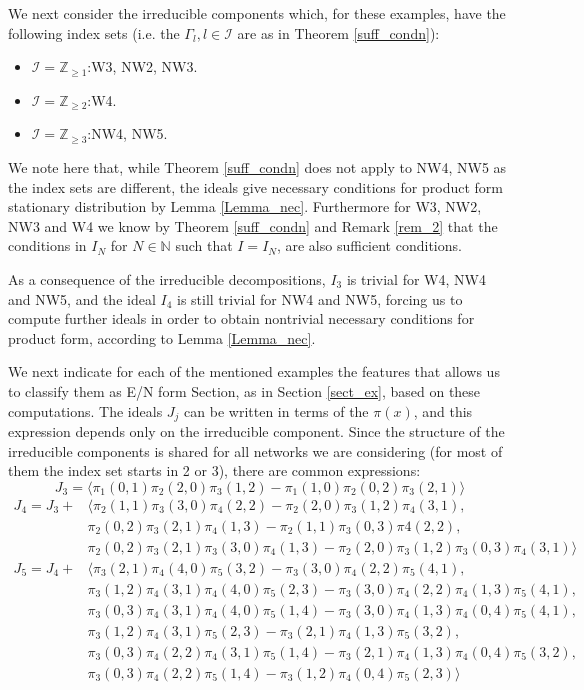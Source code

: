 \documentclass{amsart}
\theoremstyle{definition}
\theoremstyle{remark}
\theoremstyle{Conjecture/open problem}
\theoremstyle{assumption}
\theoremstyle{conjecture}
\numberwithin{equation}{section}
\begin{document}
We next consider the irreducible components which, for these examples, have the following index sets (i.e. the $\Gamma _l, l\in \mathcal{I}$ are as in Theorem \ref{suff_condn}):
\begin{itemize}
\item $\mathcal{I}=\mathbb{Z}_{\geq 1}$:W3, NW2, NW3.
\item $\mathcal{I}=\mathbb{Z}_{\geq 2}$:W4.
\item $\mathcal{I}=\mathbb{Z}_{\geq 3}$:NW4, NW5.
\end{itemize}
We note here that, while Theorem \ref{suff_condn} does not apply to NW4, NW5 as the index sets are different, the ideals give necessary conditions for product form stationary distribution by Lemma \ref{Lemma_nec}. Furthermore for W3, NW2, NW3 and W4 we know by Theorem \ref{suff_condn} and Remark \ref{rem_2} that the conditions in $I_N$ for $N\in \mathbb{N}$ such that $I=I_N$, are also sufficient conditions.

As a consequence of the irreducible decompositions, $I_3$ is trivial for W4, NW4 and NW5, and the ideal $I_4$ is still trivial for NW4 and NW5, forcing us to compute further ideals in order to obtain nontrivial necessary conditions for product form, according to Lemma \ref{Lemma_nec}.

We next indicate for each of the mentioned examples the features that allows us to classify them as E/N form Section, as in  Section \ref{sect_ex}, based on these computations. The ideals $J_j$ can be written in terms of the $\pi (x)$, and this expression depends only on the irreducible component. Since the structure of the irreducible components is shared for all networks we are considering (for most of them the index set starts in 2 or 3), there are common expressions:
\begin{equation*}
J_3= \langle \pi _1(0,1)\pi _2(2,0)\pi _3(1,2)-\pi _1(1,0)\pi _2(0,2)\pi _3(2,1) \rangle 
\end{equation*}
\begin{align*}
J_4= J_3 + & \langle \pi _2(1,1)\pi _3(3,0)\pi _4(2,2)-\pi _2(2,0)\pi _3(1,2)\pi _4(3,1), \\
& \pi _2(0,2)\pi _3(2,1)\pi _4(1,3)-\pi _2(1,1)\pi _3(0,3)\pi 4(2,2),\\
& \pi _2(0,2)\pi _3(2,1)\pi _3(3,0)\pi _4(1,3)-\pi _2(2,0)\pi _3(1,2)\pi _3(0,3)\pi _4(3,1)\rangle 
\end{align*}
\begin{align*}
J_5 = J_4 + & \langle \pi _3(2,1)\pi _4(4,0)\pi _5(3,2)-\pi _3(3,0)\pi _4(2,2)\pi _5(4,1),\\
& \pi _3(1,2)\pi _4(3,1)\pi _4(4,0)\pi _5(2,3)-\pi _3(3,0)\pi _4(2,2)\pi _4(1,3)\pi _5(4,1),\\
& \pi _3(0,3)\pi _4(3,1)\pi _4(4,0)\pi _5(1,4)-\pi _3(3,0)\pi _4(1,3)\pi _4(0,4)\pi _5(4,1),\\
& \pi _3(1,2)\pi _4(3,1)\pi _5(2,3)-\pi _3(2,1)\pi _4(1,3)\pi _5(3,2),\\
& \pi _3(0,3)\pi _4(2,2)\pi _4(3,1)\pi _5(1,4)-\pi _3(2,1)\pi _4(1,3)\pi _4(0,4)\pi _5(3,2),\\
& \pi _3(0,3)\pi _4(2,2)\pi _5(1,4)-\pi _3(1,2)\pi _4(0,4)\pi _5(2,3) \rangle
\end{align*}
\end{document}
